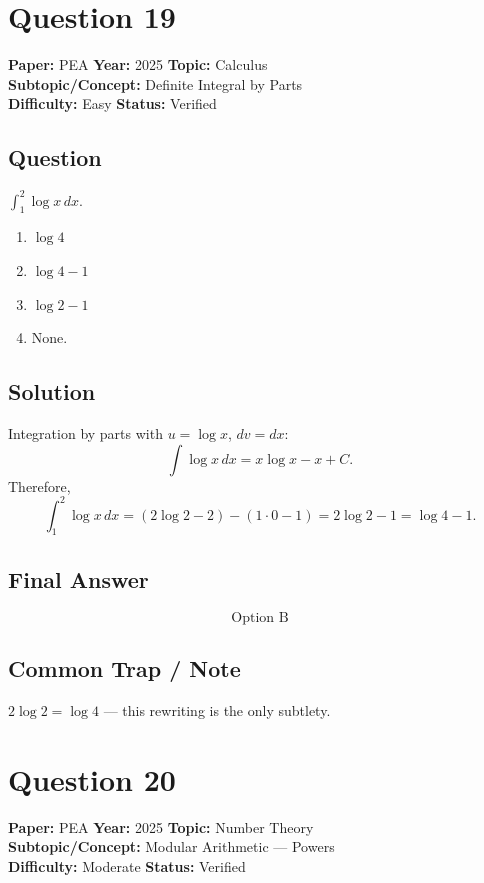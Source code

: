 \documentclass[11pt]{article}
\begin{document}
\section*{Question 19}
\textbf{Paper:} PEA \quad \textbf{Year:} 2025 \quad \textbf{Topic:} Calculus \\
\textbf{Subtopic/Concept:} Definite Integral by Parts \\
\textbf{Difficulty:} Easy \quad \textbf{Status:} Verified

\subsection*{Question}
$\displaystyle \int_1^2 \log x\, dx$.
\begin{enumerate}[label=(\Alph*)]
\item $\log 4$ \item $\log 4 - 1$ \item $\log 2 - 1$ \item None.
\end{enumerate}

\subsection*{Solution}
Integration by parts with $u = \log x$, $dv = dx$:
\[
\int \log x\, dx = x\log x - x + C.
\]
Therefore,
\[
\int_1^2 \log x\, dx = (2\log 2 - 2) - (1\cdot 0 - 1) = 2\log 2 - 1 = \log 4 - 1.
\]

\subsection*{Final Answer}
\[
\boxed{\text{Option B}}
\]

\subsection*{Common Trap / Note}
$2 \log 2 = \log 4$ --- this rewriting is the only subtlety.

\section*{Question 20}
\textbf{Paper:} PEA \quad \textbf{Year:} 2025 \quad \textbf{Topic:} Number Theory \\
\textbf{Subtopic/Concept:} Modular Arithmetic --- Powers \\
\textbf{Difficulty:} Moderate \quad \textbf{Status:} Verified
\end{document}
